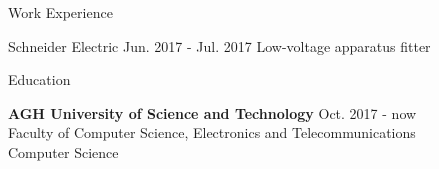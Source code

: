 \documentclass{resume} %
\begin{document}



\begin{rSection}
{Work Experience}
\begin{rSubsection}
{Schneider Electric}
{Jun. 2017 - Jul. 2017}
{Low-voltage apparatus fitter}

\end{rSubsection}

\end{rSection}


\begin{rSection}{Education}

{\bf AGH University of Science and Technology} \hfill {Oct. 2017 - now} 
\\ Faculty of Computer Science, Electronics and Telecommunications
\\ Computer Science

\end{rSection}

\end{document}
